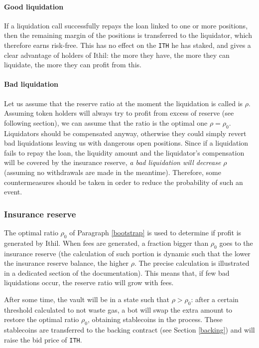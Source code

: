 \documentclass[a4paper,10 pt]{article}
\theoremstyle{definition}
\begin{document}
\paragraph{Good liquidation}
If a liquidation call successfully repays the loan linked to one or more positions, then the remaining margin of the positions is transferred to the liquidator, which therefore earns risk-free. This has no effect on the \verb|ITH| he has staked, and gives a clear advantage of holders of Ithil: the more they have, the more they can liquidate, the more they can profit from this.

\paragraph{Bad liquidation}
Let us assume that the reserve ratio at the moment the liquidation is called is $\rho$. Assuming token holders will always try to profit from excess of reserve (see following section), we can assume that the ratio is the optimal one $\rho=\rho_0$.  Liquidators should be compensated anyway, otherwise they could simply revert bad liquidations leaving us with dangerous open positions. Since if a liquidation fails to repay the loan, the liquidity amount and the liquidator's compensation will be covered by the insurance reserve, {\it a bad liquidation will decrease $\rho$} (assuming no withdrawals are made in the meantime). Therefore, some countermeasures should be taken in order to reduce the probability of such an event.

\subsubsection{Insurance reserve}

The optimal ratio $\rho_0$ of Paragraph \ref{bootstrap} is used to determine if profit is generated by Ithil. When fees are generated, a fraction bigger than $\rho_0$ goes to the insurance reserve (the calculation of such portion is dynamic such that the lower the insurance reserve balance, the higher $\rho$. The precise calculation is illustrated in a dedicated section of the documentation). This means that, if few bad liquidations occur, the reserve ratio will grow with fees.

After some time, the vault will be in a state such that $\rho > \rho_0$: after a certain threshold calculated to not waste gas, a bot will swap the extra amount to restore the optimal ratio $\rho_0$, obtaining stablecoins in the process. These stablecoins are transferred to the backing contract (see Section \ref{backing}) and will raise the bid price of \verb|ITH|.
\end{document}
